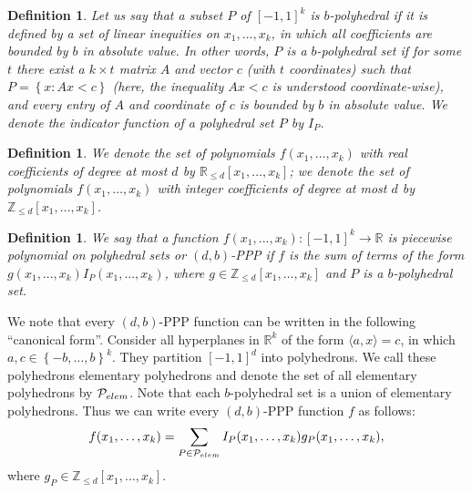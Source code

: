 \documentclass[11pt]{article}
\newcommand {\set}   [1] {\left\{ #1 \right\}}
\newcommand {\bbZ}    {\mathbb{Z}}
\newcommand {\bbR}    {\mathbb{R}}
\newcommand {\calP}   {{\cal{P}}}
\newtheorem{definition}[theorem]{Definition}
\begin{document}
\begin{definition}
Let us say that a subset $P$ of $[-1,1]^k$ is $b$-polyhedral if it is defined by a set of linear inequities on $x_1, ..., x_k$, in which all coefficients are bounded by $b$ in absolute value.
 In other words, $P$ is a $b$-polyhedral set if for some $t$ there exist a $k \times t$ matrix $A$ and vector $c$ (with $t$ coordinates) such that
  $P=\set{x:Ax < c}$ (here, the inequality $Ax <c$ is understood coordinate-wise), and  every entry of $A$ and coordinate of $c$ is bounded by $b$ in absolute value.
 We denote the indicator function of a polyhedral set $P$ by $I_P$.
\end{definition}
\begin{definition}
We denote the set of polynomials $f(x_1,\dots, x_k)$ with real coefficients  of degree at most $d$ by $\bbR_{\leq d}[x_1,\dots,x_k]$;
we denote the set of polynomials  $f(x_1,\dots, x_k)$ with integer coefficients of degree at most $d$  by $\bbZ_{\leq d}[x_1,\dots,x_k]$.
\end{definition}
\begin{definition}
We say that a function $f(x_1,..., x_k): [-1,1]^k \to \bbR$ is piecewise polynomial on polyhedral sets or $(d,b)$-PPP if $f$ is the sum of terms of the form $g(x_1,..., x_k) I_P(x_1,...,x_k)$, where $g\in \bbZ_{\leq d}[x_1,\dots, x_k]$ and $P$ is a $b$-polyhedral set.
\end{definition}

We note that every $(d,b)$-PPP function can be written in the following ``canonical form''. Consider all hyperplanes in $\bbR^k$ of the form $\langle a, x\rangle = c$,
in which $a,c \in\set{-b,\dots,b}^k$. They partition $[-1,1]^d$ into polyhedrons. We call these polyhedrons elementary polyhedrons and denote the set of all
elementary polyhedrons by $\calP_{elem}$. Note that each $b$-polyhedral set is a union of elementary polyhedrons.
Thus we can write every $(d,b)$-PPP function $f$ as follows:
\begin{equation}
f(x_1,\dots, x_k) = \sum_{P\in \calP_{elem}} I_P(x_1,\dots,x_k) g_P(x_1,\dots,x_k), \label{eq:canonical-form}
\end{equation}
where $g_P \in \bbZ_{\leq d}[x_1,\dots,x_k]$.
\end{document}
